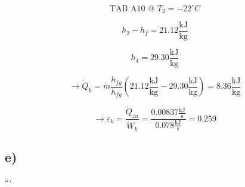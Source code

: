 \[
\text{TAB A10 @ } T_2 = -22^\circ C
\]

\[
h_2 - h_f = 21.12 \frac{\text{kJ}}{\text{kg}}
\]

\[
h_4 = 29.30 \frac{\text{kJ}}{\text{kg}}
\]

\[
\rightarrow \dot{Q}_k = \dot{m} \frac{h_{fg}}{h_{fg}} \left( 21.12 \frac{\text{kJ}}{\text{kg}} - 29.30 \frac{\text{kJ}}{\text{kg}} \right) = 8.36 \frac{\text{kJ}}{\text{kg}}
\]

\[
\rightarrow \varepsilon_k = \frac{\dot{Q}_{zu}}{\dot{W}_k} = \frac{0.00837 \frac{\text{kJ}}{\text{s}}}{0.078 \frac{\text{kJ}}{\text{s}}} = 0.259
\]

\subsection*{e)}

```